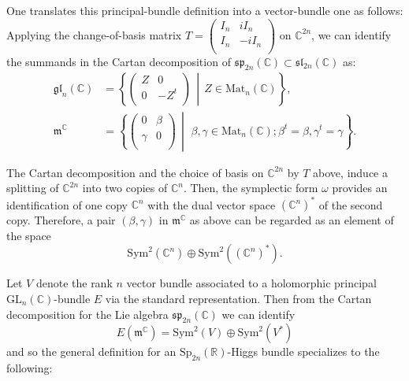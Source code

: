 \documentclass[oneside,11pt]{amsart}
\theoremstyle{definition}
\theoremstyle{remark}
\newcommand{\midwd}{\,\middle\vert\,}
\numberwithin{thm}{section}
\numberwithin{equation}{section}
\begin{document}
One translates this principal-bundle definition into a vector-bundle one as follows:  
Applying the change-of-basis matrix $T=\left( \begin{matrix}
   I_n & iI_n  \\
   I_n & -iI_n  \\
\end{matrix} \right)$ on ${{\mathbb{C}}^{2n}}$, we can identify the summands in the Cartan decomposition of $\mathfrak{sp}_{2n}\left(\mathbb{C} \right)\subset \mathfrak{sl}_{2n}\left(\mathbb{C} \right)$ as:
\begin{align*}
\mathfrak{gl}_n\left(\mathbb{C} \right)& =\left\{ \left( \begin{matrix}
   Z & 0  \\
   0 & -{{Z}^{t}}  \\
\end{matrix} \right)\midwd Z\in {{\mathsf{\mathrm{Mat}}}_{n}}\left( \mathbb{C} \right) \right\},\\
{{\mathfrak{m}}^{\mathbb{C}}}& =\left\{ \left( \begin{matrix}
   0 & \beta   \\
   \gamma  & 0  \\
\end{matrix} \right)\midwd \,\beta ,\gamma \in {{\mathsf{\mathrm{Mat}}}_{n}}\left( \mathbb{C} \right);{{\beta }^{t}}=\beta ,{{\gamma }^{t}}=\gamma   \right\}.
\end{align*}

The Cartan decomposition and the choice of basis on $\mathbb{C}^{2n}$ by $T$ above, induce a splitting of $\mathbb{C}^{2n}$ into two copies of $\mathbb{C}^n$. Then, the symplectic form $\omega$ provides an identification of one copy $\mathbb{C}^n$ with the dual vector space $(\mathbb{C}^n)^*$ of the second copy. Therefore, a pair $(\beta, \gamma)$ in $\mathfrak{m}^{\mathbb{C}}$ as above can be regarded as an element of the space   
\[\mathrm{Sym}^{2}\left( {{\mathbb{C}}^{n}} \right)\oplus \mathrm{Sym}^{2}\left( {{\left( {{\mathbb{C}}^{n}} \right)}^{*}} \right).\]

Let $V$ denote the rank $n$ vector bundle associated to a holomorphic principal $\mathrm{GL}_n( \mathbb{C})$-bundle $E$ via the standard representation. Then from the Cartan decomposition for the Lie algebra $\mathfrak{sp}_{2n}\left(\mathbb{C} \right)$ we can identify
	\[E\left( {{\mathfrak{m}}^{\mathbb{C}}} \right)={\mathrm{Sym}}^{2}\left( V \right)\oplus {\mathrm{Sym}}^{2}\left( {{V}^{*}} \right)\]
and so the general definition for an $\mathrm{Sp}_{2n}( \mathbb{R})$-Higgs bundle specializes to the following:
\end{document}
